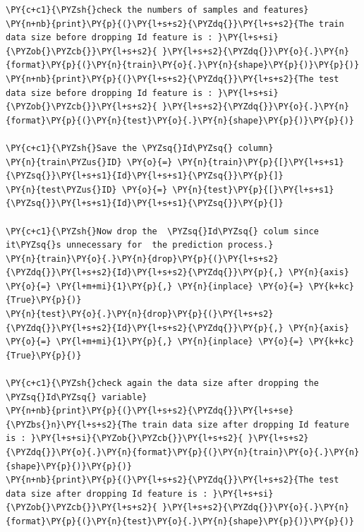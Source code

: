 \documentclass[no-math]{YangThesis}
\begin{document}
\begin{tcolorbox}[breakable, size=fbox, boxrule=1pt, pad at break*=1mm,colback=cellbackground, colframe=cellborder]
	\begin{Verbatim}[commandchars=\\\{\}]
\PY{c+c1}{\PYZsh{}check the numbers of samples and features}
\PY{n+nb}{print}\PY{p}{(}\PY{l+s+s2}{\PYZdq{}}\PY{l+s+s2}{The train data size before dropping Id feature is : }\PY{l+s+si}{\PYZob{}\PYZcb{}}\PY{l+s+s2}{ }\PY{l+s+s2}{\PYZdq{}}\PY{o}{.}\PY{n}{format}\PY{p}{(}\PY{n}{train}\PY{o}{.}\PY{n}{shape}\PY{p}{)}\PY{p}{)}
\PY{n+nb}{print}\PY{p}{(}\PY{l+s+s2}{\PYZdq{}}\PY{l+s+s2}{The test data size before dropping Id feature is : }\PY{l+s+si}{\PYZob{}\PYZcb{}}\PY{l+s+s2}{ }\PY{l+s+s2}{\PYZdq{}}\PY{o}{.}\PY{n}{format}\PY{p}{(}\PY{n}{test}\PY{o}{.}\PY{n}{shape}\PY{p}{)}\PY{p}{)}

\PY{c+c1}{\PYZsh{}Save the \PYZsq{}Id\PYZsq{} column}
\PY{n}{train\PYZus{}ID} \PY{o}{=} \PY{n}{train}\PY{p}{[}\PY{l+s+s1}{\PYZsq{}}\PY{l+s+s1}{Id}\PY{l+s+s1}{\PYZsq{}}\PY{p}{]}
\PY{n}{test\PYZus{}ID} \PY{o}{=} \PY{n}{test}\PY{p}{[}\PY{l+s+s1}{\PYZsq{}}\PY{l+s+s1}{Id}\PY{l+s+s1}{\PYZsq{}}\PY{p}{]}

\PY{c+c1}{\PYZsh{}Now drop the  \PYZsq{}Id\PYZsq{} colum since it\PYZsq{}s unnecessary for  the prediction process.}
\PY{n}{train}\PY{o}{.}\PY{n}{drop}\PY{p}{(}\PY{l+s+s2}{\PYZdq{}}\PY{l+s+s2}{Id}\PY{l+s+s2}{\PYZdq{}}\PY{p}{,} \PY{n}{axis} \PY{o}{=} \PY{l+m+mi}{1}\PY{p}{,} \PY{n}{inplace} \PY{o}{=} \PY{k+kc}{True}\PY{p}{)}
\PY{n}{test}\PY{o}{.}\PY{n}{drop}\PY{p}{(}\PY{l+s+s2}{\PYZdq{}}\PY{l+s+s2}{Id}\PY{l+s+s2}{\PYZdq{}}\PY{p}{,} \PY{n}{axis} \PY{o}{=} \PY{l+m+mi}{1}\PY{p}{,} \PY{n}{inplace} \PY{o}{=} \PY{k+kc}{True}\PY{p}{)}

\PY{c+c1}{\PYZsh{}check again the data size after dropping the \PYZsq{}Id\PYZsq{} variable}
\PY{n+nb}{print}\PY{p}{(}\PY{l+s+s2}{\PYZdq{}}\PY{l+s+se}{\PYZbs{}n}\PY{l+s+s2}{The train data size after dropping Id feature is : }\PY{l+s+si}{\PYZob{}\PYZcb{}}\PY{l+s+s2}{ }\PY{l+s+s2}{\PYZdq{}}\PY{o}{.}\PY{n}{format}\PY{p}{(}\PY{n}{train}\PY{o}{.}\PY{n}{shape}\PY{p}{)}\PY{p}{)} 
\PY{n+nb}{print}\PY{p}{(}\PY{l+s+s2}{\PYZdq{}}\PY{l+s+s2}{The test data size after dropping Id feature is : }\PY{l+s+si}{\PYZob{}\PYZcb{}}\PY{l+s+s2}{ }\PY{l+s+s2}{\PYZdq{}}\PY{o}{.}\PY{n}{format}\PY{p}{(}\PY{n}{test}\PY{o}{.}\PY{n}{shape}\PY{p}{)}\PY{p}{)}
	\end{Verbatim}
\end{tcolorbox}
\end{document}

